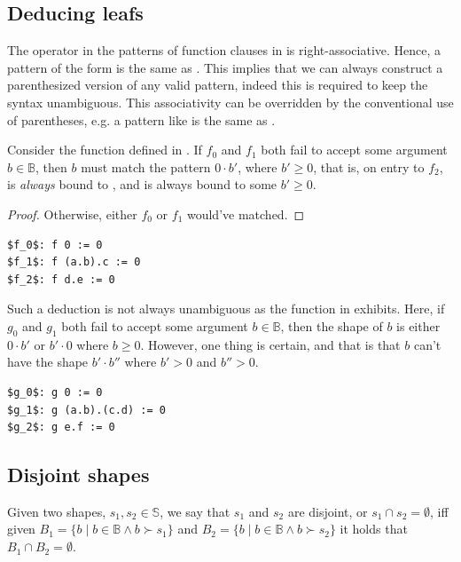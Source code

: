\subsection{Deducing leafs}\label{section:extend-deducing-zero}

The  operator in the patterns of function clauses in \D{} is
right-associative. Hence, a pattern of the form  is the same as
. This implies that we can always construct a parenthesized
version of any valid pattern, indeed this is required to keep the syntax
unambiguous. This associativity can be overridden by the conventional use of
parentheses, e.g. a pattern like  is the same as
. 

Consider the function defined in . If $f_0$ and
$f_1$ both fail to accept some argument $b\in\mathbb{B}$, then $b$ must match
the pattern $0\cdot b'$, where $b'\geq 0$, that is, on entry to $f_2$, 
is \emph{always} bound to , and  is always bound to some
$b'\geq 0$.

\begin{proof} Otherwise, either $f_0$ or $f_1$ would've matched. \end{proof}

\begin{lstlisting}[label=listing:deducing-zero,
  caption={A sample program for showing 0-deduction.}]
$f_0$: f 0 := 0
$f_1$: f (a.b).c := 0
$f_2$: f d.e := 0
\end{lstlisting}

Such a deduction is not always unambiguous as the function in
 exhibits. Here, if $g_0$ and $g_1$ both
fail to accept some argument $b\in\mathbb{B}$, then the shape of $b$ is either
$0\cdot b'$ or $b'\cdot 0$ where $b\geq 0$. However, one thing is certain, and
that is that $b$ can't have the shape $b'\cdot b''$ where $b'>0$ and $b''>0$.

\begin{lstlisting}[label=listing:deducing-zero-fail,
  caption={A sample program where 0-deduction is ambiguous.}]
$g_0$: g 0 := 0
$g_1$: g (a.b).(c.d) := 0
$g_2$: g e.f := 0
\end{lstlisting}

\subsection{Disjoint shapes}

\begin{definition} Given two shapes, $s_1,s_2\in\mathbb{S}$, we say that $s_1$
and $s_2$ are disjoint, or $s_1\cap s_2=\emptyset$, iff given $B_1=\{b\mid
b\in\mathbb{B} \wedge b\succ s_1\}$ and $B_2=\{b\mid b\in\mathbb{B} \wedge
b\succ s_2\}$ it holds that $B_1\cap B_2=\emptyset$.\end{definition}

